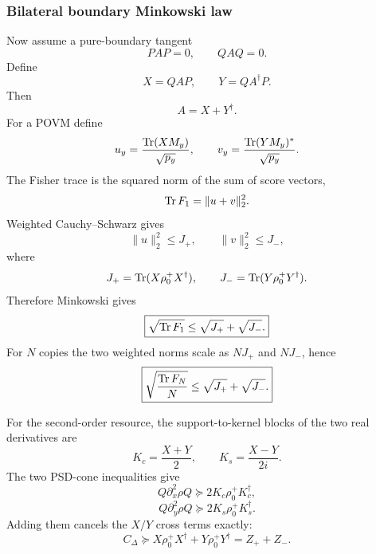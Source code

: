 \subsubsection{Bilateral boundary Minkowski law}

Now assume a pure-boundary tangent
\begin{equation}
PAP=0,
\qquad
QAQ=0.
\end{equation}
Define
\begin{equation}
X=QAP,
\qquad
Y=QA^\dagger P.
\end{equation}
Then
\begin{equation}
A=X+Y^\dagger.
\end{equation}
For a POVM define
\begin{equation}
u_y=\frac{\operatorname{Tr}(XM_y)}{\sqrt{p_y}},
\qquad
v_y=\frac{\operatorname{Tr}(YM_y)^*}{\sqrt{p_y}}.
\end{equation}
The Fisher trace is the squared norm of the sum of score vectors,
\begin{equation}
\operatorname{Tr} F_1=\|u+v\|_2^2.
\end{equation}
Weighted Cauchy--Schwarz gives
\begin{equation}
\|u\|_2^2\le J_+,
\qquad
\|v\|_2^2\le J_-,
\end{equation}
where
\begin{equation}
J_+=\operatorname{Tr}(X\rho_0^+X^\dagger),
\qquad
J_-=\operatorname{Tr}(Y\rho_0^+Y^\dagger).
\end{equation}
Therefore Minkowski gives
\begin{equation}
\boxed{
\sqrt{\operatorname{Tr} F_1}\le\sqrt{J_+}+\sqrt{J_-}.
}
\end{equation}
For $N$ copies the two weighted norms scale as $NJ_+$ and $NJ_-$, hence
\begin{equation}
\boxed{
\sqrt{\frac{\operatorname{Tr} F_N}{N}}
\le\sqrt{J_+}+\sqrt{J_-}.
}
\label{eq:bilateral-N}
\end{equation}

For the second-order resource, the support-to-kernel blocks of the two real derivatives are
\begin{equation}
K_c=\frac{X+Y}{2},
\qquad
K_s=\frac{X-Y}{2i}.
\end{equation}
The two PSD-cone inequalities give
\begin{equation}
Q\partial_x^2\rho Q\succeq2K_c\rho_0^+K_c^\dagger,
\end{equation}
\begin{equation}
Q\partial_y^2\rho Q\succeq2K_s\rho_0^+K_s^\dagger.
\end{equation}
Adding them cancels the $X/Y$ cross terms exactly:
\begin{equation}
C_\Delta\succeq
X\rho_0^+X^\dagger+Y\rho_0^+Y^\dagger
=Z_++Z_-.
\label{eq:bilateral-shared-curvature}
\end{equation}


